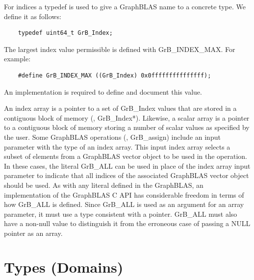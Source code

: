 For indices a {\sf typedef} is used to give a GraphBLAS name to a concrete type. We define it as follows:
\begin{verbatim}
    typedef uint64_t GrB_Index;
\end{verbatim}
The largest index value permissible is defined with {\sf GrB\_INDEX\_MAX}. For example:
\begin{verbatim}
    #define GrB_INDEX_MAX ((GrB_Index) 0x0fffffffffffffff);
\end{verbatim}
An implementation is required to define and document this value.

An index array is a pointer to a set of {\sf GrB\_Index} values that are 
stored in a contiguous block of memory (\ie, {\sf GrB\_Index*}).
Likewise, a scalar array is a pointer to a contiguous block of memory 
storing a number of scalar values as specified by the user.
Some GraphBLAS operations (\eg, {\sf GrB\_assign})  include an input parameter with the type of an index array. 
This input index array selects a subset of elements from a GraphBLAS vector object to be used in the operation.
In these cases, the literal {\sf GrB\_ALL} 
can be used in place of the index array input parameter to indicate that all indices 
of the associated GraphBLAS vector object should be used.
As with any literal defined in the GraphBLAS, an implementation of the GraphBLAS C API has considerable 
freedom in terms of how {\sf GrB\_ALL} is defined.  Since {\sf GrB\_ALL} is used as an argument for an array 
parameter, it must use a type consistent with a pointer. {\sf GrB\_ALL} must also have a non-null
value to distinguish it from the erroneous case of passing a {\sf NULL} pointer as an array.

\section{Types (Domains)}
\label{Sec:Domains}

